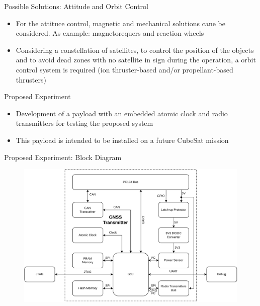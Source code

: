 \begin{frame}{Possible Solutions: Attitude and Orbit Control}

    \begin{itemize}
        \item For the attituce control, magnetic and mechanical solutions cane be considered. As example: magnetorequers and reaction wheels
        \vspace{0.2cm}
        \item Considering a constellation of satellites, to control the position of the objects and to avoid dead zones with no satellite in sign during the operation, a orbit control system is required (ion thruster-based and/or propellant-based thrusters)
    \end{itemize}

\end{frame}

\begin{frame}{Proposed Experiment}

    \begin{itemize}
        \item Development of a payload with an embedded atomic clock and radio transmitters for testing the proposed system
        \vspace{0.5cm}
        \item This payload is intended to be installed on a future CubeSat mission
    \end{itemize}

\end{frame}

\begin{frame}{Proposed Experiment: Block Diagram}

    \begin{figure}[!ht]
        \begin{center}
            \includegraphics[scale=0.5]{figures/block-diagram}
        \end{center}
    \end{figure}

\end{frame}

